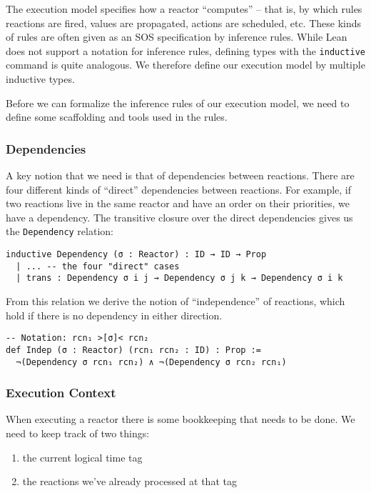 The execution model specifies how a reactor ``computes'' -- that is, by which rules reactions are fired, values are propagated, actions are scheduled, etc. 
These kinds of rules are often given as an SOS specification by inference rules.
While Lean does not support a notation for inference rules, defining types with the \lstinline{inductive} command is quite analogous.
We therefore define our execution model by multiple inductive types.

Before we can formalize the inference rules of our execution model, we need to define some scaffolding and tools used in the rules.

\subsubsection{Dependencies}

A key notion that we need is that of dependencies between reactions. 
There are four different kinds of ``direct'' dependencies between reactions.
For example, if two reactions live in the same reactor and have an order on their priorities, we have a dependency.
The transitive closure over the direct dependencies gives us the \lstinline{Dependency} relation:

\begin{lstlisting}
inductive Dependency (σ : Reactor) : ID → ID → Prop
  | ... -- the four "direct" cases
  | trans : Dependency σ i j → Dependency σ j k → Dependency σ i k
\end{lstlisting}

From this relation we derive the notion of ``independence'' of reactions, which hold if there is no dependency in either direction.

\begin{lstlisting}
-- Notation: rcn₁ >[σ]< rcn₂
def Indep (σ : Reactor) (rcn₁ rcn₂ : ID) : Prop :=
  ¬(Dependency σ rcn₁ rcn₂) ∧ ¬(Dependency σ rcn₂ rcn₁)
\end{lstlisting}

\subsubsection{Execution Context}

When executing a reactor there is some bookkeeping that needs to be done.
We need to keep track of two things:

\begin{enumerate}
  \item the current logical time tag
  \item the reactions we've already processed at that tag
\end{enumerate}

